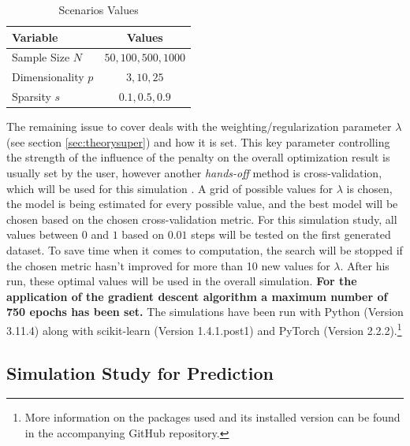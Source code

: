\documentclass[12pt,a4paper]{article}
\begin{document}
\begin{table}[h!]
\begin{center}
\begin{tabular}{lc}\toprule
Variable & Values\\\midrule
Sample Size $N$ & $50, 100, 500, 1000$\\
Dimensionality $p$ & $3, 10, 25$\\
Sparsity $s$ & $0.1, 0.5, 0.9$\\\bottomrule
\end{tabular}
\caption{Scenarios Values}
\label{tab:Scenarios}
\end{center}
\end{table}

The remaining issue to cover deals with the weighting/regularization parameter $\lambda$ (see section \ref{sec:theorysuper}) and how it is set. This key parameter controlling the strength of the influence of the penalty on the overall optimization result is usually set by the user, however another \textit{hands-off} method is cross-validation, which will be used for this simulation \parencite[250--251]{ESL2009}. A grid of possible values for $\lambda$ is chosen, the model is being estimated for every possible value, and the best model will be chosen based on the chosen cross-validation metric. For this simulation study, all values between $0$ and $1$ based on $0.01$ steps will be tested on the first generated dataset. To save time when it comes to computation, the search will be stopped if the chosen metric hasn't improved for more than 10 new values for $\lambda$. After his run, these optimal values will be used in the overall simulation. \textbf{For the application of the gradient descent algorithm a maximum number of 750 epochs has been set.} The simulations have been run with Python (Version 3.11.4) along with scikit-learn (Version 1.4.1.post1) and PyTorch (Version 2.2.2).\footnote{More information on the packages used and its installed version can be found in the accompanying GitHub repository.}

\subsection{Simulation Study for Prediction} 
\end{document}
